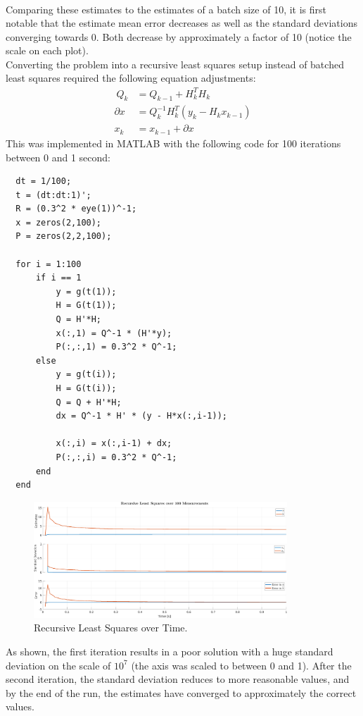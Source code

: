 \documentclass[11pt]{article}
\begin{document}
\begin{enumerate}[label=\textbf{\arabic*.}]
\begin{equation*}
\begin{split}
    \end{split}
  \end{equation*}
  Comparing these estimates to the estimates of a batch size of 10, it is first 
  notable that the estimate mean error decreases as well as the standard 
  deviations converging towards 0. Both decrease by approximately a factor of 
  10 (notice the scale on each plot). \\
  Converting the problem into a recursive least squares setup instead of 
  batched least squares required the following equation adjustments:
  \begin{equation*}
    \begin{split}\
      Q_{k} &= Q_{k-1} + H_k^TH_k \\
      \partial{x} &= Q_k^{-1} H_k^T \left(y_k - H_k x_{k-1}\right) \\
      x_k &= x_{k-1} + \partial{x}
    \end{split}
  \end{equation*}
  This was implemented in MATLAB with the following code for 100 iterations
  between 0 and 1 second:
  \begin{lstlisting}
  dt = 1/100;
  t = (dt:dt:1)';
  R = (0.3^2 * eye(1))^-1;
  x = zeros(2,100);
  P = zeros(2,2,100);
  
  for i = 1:100
      if i == 1
          y = g(t(1));
          H = G(t(1));
          Q = H'*H;
          x(:,1) = Q^-1 * (H'*y);
          P(:,:,1) = 0.3^2 * Q^-1;
      else
          y = g(t(i));
          H = G(t(i));
          Q = Q + H'*H;
          dx = Q^-1 * H' * (y - H*x(:,i-1));
  
          x(:,i) = x(:,i-1) + dx;
          P(:,:,i) = 0.3^2 * Q^-1;
      end
  end
  \end{lstlisting}
  \begin{figure}[H]
    \centering
    \includegraphics[width=0.85\textwidth]{3d.png}
    \caption{Recursive Least Squares over Time.}
  \end{figure}
  As shown, the first iteration results in a poor solution with a huge standard 
  deviation on the scale of $10^7$ (the axis was scaled to between 0 and 1). 
  After the second iteration, the standard deviation reduces to more 
  reasonable values, and by the end of the run, the estimates have 
  converged to approximately the correct values.


\end{enumerate}
\end{document}
